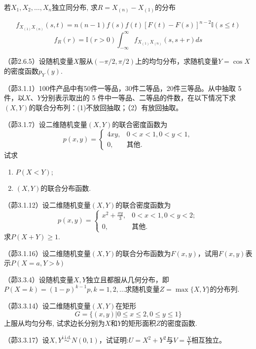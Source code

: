 \begin{example}
    若$X_1,X_2,\dotsc,X_n$独立同分布, 求$R=X_{(n)}-X_{(1)}$的分布
\end{example}
\begin{solution}
    \[ f_{X_{(1)}X_{(n)}}(s,t)=n(n-1)f(s)f(t)[F(t)-F(s)]^{n-2}\mathbb{I}(s\le t) \]
    \[ f_R(r)=\mathbb{I}(r>0)\int_{-\infty}^{\infty}f_{X_{(1)}X_{(n)}}(s,s+r)ds \]
\end{solution}

\begin{problemset}[错题记录]
    \item （茆2.6.5）设随机变量$X$服从$(-\pi/2,\pi/2)$上的均匀分布，求随机变量$Y=\cos X$的密度函数$p_Y(y)$.
    \item （茆3.1.1）100件产品中有50件一等品，30件二等品，20件三等品。从中抽取 5 件，以$X$、$Y$分别表示取出的 5 件中一等品、二等品的件数，在以下情况下求$(X,Y)$的联合分布列：(1)不放回抽取；（2）有放回抽取。
    \item （茆3.1.7）设二维随机变量$(X,Y)$的联合密度函数为
    \[ p(x, y)=\begin{cases}
            4 x y, & 0<x<1,0<y<1,  \\
            0,     & \text{其他} .
        \end{cases}	\]
    试求
    \begin{enumerate}[(1)]
        \item$P(X<Y)$;
        \item$(X,Y)$的联合分布函数.
    \end{enumerate}
    \item （茆3.1.12）设二维随机变量$(X,Y)$的联合密度函数为
    \[
        p(x,y)=\begin{cases}
            x^2+\frac{xy}{3}, & 0<x<1,0<y<2;  \\
            0,                & \text{其他} .
        \end{cases}
    \]
    求$P(X+Y)\geq 1$.
    \item （茆3.1.16）设二维随机变量$(X,Y)$的联合分布函数为$F(x,y)$，试用$F(x,y)$表示$P(X=a,Y>b)$
    \item （茆3.3.4）设随机变量$X,Y$独立且都服从几何分布，即$P(X=k)=(1-p)^{k-1}p,k=1,2,\ldots$求随机变量$Z=\max\{X,Y\}$的分布列.
    \item （茆3.3.14）设二维随机变量$(X,Y)$在矩形
    \[ G=\{(x,y)|0 \le x \le 2,0 \le y \le 1\} \]
    上服从均匀分布, 试求边长分别为$X$和$Y$的矩形面积$Z$的密度函数.
    \item （茆3.3.17）设$X,Y \overset{\text{i.i.d.}}{\sim} N(0,1)$，试证明:$U=X^2+Y^2$与$V=\frac{X}{Y}$相互独立。
\end{problemset}
